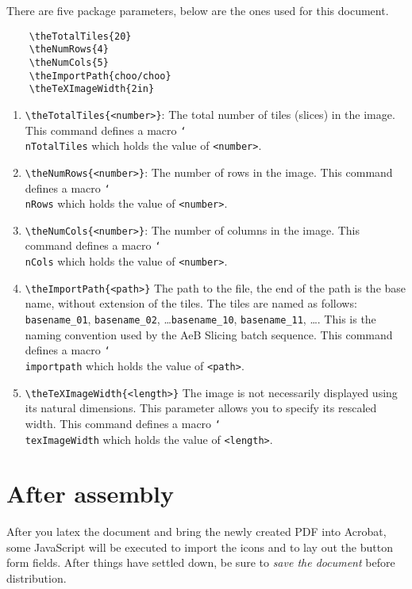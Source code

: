 \documentclass{article}
\newcommand{\cs}[1]{\texttt{\char`\\#1}}
\begin{document}
There are five package parameters, below are the ones used for this
document.
\begin{verbatim}
    \theTotalTiles{20}
    \theNumRows{4}
    \theNumCols{5}
    \theImportPath{choo/choo}
    \theTeXImageWidth{2in}
\end{verbatim}
\begin{enumerate}
\item \verb!\theTotalTiles{<number>}!: The total number of tiles
    (slices) in the image. This command defines a macro \cs{nTotalTiles}
    which holds the value of \texttt{<number>}.

\item \verb!\theNumRows{<number>}!: The number of rows in the image.
    This command defines a macro \cs{nRows} which holds the value of
    \texttt{<number>}.

\item \verb!\theNumCols{<number>}!: The number of columns in the
    image. This command defines a macro \cs{nCols} which holds the value
    of \texttt{<number>}.

\item \verb!\theImportPath{<path>}! The path to the file, the end of
    the path is the base name, without extension of the tiles. The tiles
    are named as follows: \texttt{basename\_01}, \texttt{basename\_02},
    \dots \texttt{basename\_10}, \texttt{basename\_11}, \dots. This is
    the naming convention used by the \textsf{AeB Slicing} batch
    sequence. This command defines a macro \cs{importpath} which holds
    the value of \texttt{<path>}.

\item \verb!\theTeXImageWidth{<length>}! The image is not necessarily
    displayed using its natural dimensions. This parameter allows you to
    specify its rescaled width. This command defines a macro
    \cs{texImageWidth} which holds the value of \texttt{<length>}.

\end{enumerate}

\section{After assembly}

After you latex the document and bring the newly created PDF into
Acrobat, some JavaScript will be executed to import the icons and to
lay out the button form fields. After things have settled down, be
sure to \emph{save the document} before distribution.
\end{document}
